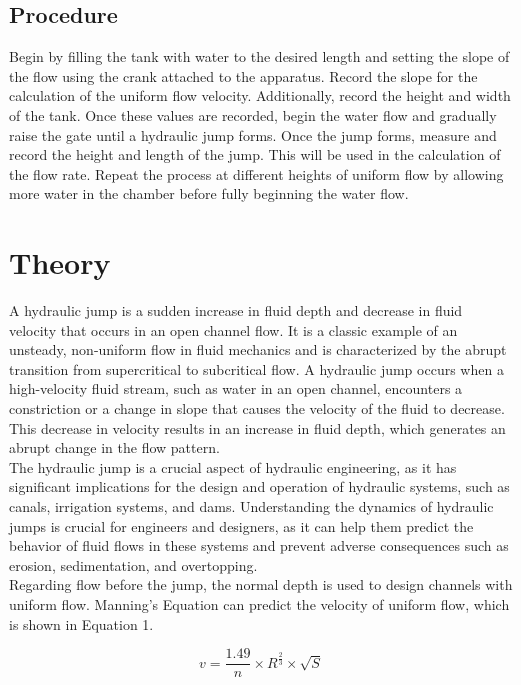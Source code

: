 \documentclass{article}
\begin{document}
\subsection{Procedure}
\par Begin by filling the tank with water to the desired length and setting the slope of the flow using the crank attached to the apparatus. Record the slope for the calculation of the uniform flow velocity. Additionally, record the height and width of the tank. Once these values are recorded, begin the water flow and gradually raise the gate until a hydraulic jump forms. Once the jump forms, measure and record the height and length of the jump. This will be used in the calculation of the flow rate. Repeat the process at different heights of uniform flow by allowing more water in the chamber before fully beginning the water flow.

\newpage
\section{Theory}
\noindent A hydraulic jump is a sudden increase in fluid depth and decrease in fluid velocity that occurs in an open channel flow. It is a classic example of an unsteady, non-uniform flow in fluid mechanics and is characterized by the abrupt transition from supercritical to subcritical flow. A hydraulic jump occurs when a high-velocity fluid stream, such as water in an open channel, encounters a constriction or a change in slope that causes the velocity of the fluid to decrease. This decrease in velocity results in an increase in fluid depth, which generates an abrupt change in the flow pattern.\\

\noindent The hydraulic jump is a crucial aspect of hydraulic engineering, as it has significant implications for the design and operation of hydraulic systems, such as canals, irrigation systems, and dams. Understanding the dynamics of hydraulic jumps is crucial for engineers and designers, as it can help them predict the behavior of fluid flows in these systems and prevent adverse consequences such as erosion, sedimentation, and overtopping.\\

\noindent Regarding flow before the jump, the normal depth is used to design channels with uniform flow. Manning's Equation can predict the velocity of uniform flow, which is shown in Equation 1. 

\begin{equation}
    v=\frac{1.49}{n}\times R^{\frac{2}{3}}\times\sqrt{S}
\end{equation}
\end{document}
